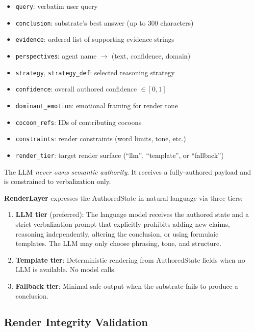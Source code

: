 \documentclass[11pt,a4paper]{article}
\begin{document}
\begin{itemize}[nosep]
  \item \texttt{query}: verbatim user query
  \item \texttt{conclusion}: substrate's best answer (up to 300 characters)
  \item \texttt{evidence}: ordered list of supporting evidence strings
  \item \texttt{perspectives}: agent name $\to$ (text, confidence, domain)
  \item \texttt{strategy}, \texttt{strategy\_def}: selected reasoning strategy
  \item \texttt{confidence}: overall authored confidence $\in [0,1]$
  \item \texttt{dominant\_emotion}: emotional framing for render tone
  \item \texttt{cocoon\_refs}: IDs of contributing cocoons
  \item \texttt{constraints}: render constraints (word limits, tone, etc.)
  \item \texttt{render\_tier}: target render surface (``llm'', ``template'',
    or ``fallback'')
\end{itemize}

The LLM \emph{never owns semantic authority}. It receives a fully-authored
payload and is constrained to verbalization only.

\textbf{RenderLayer} expresses the AuthoredState in natural language via three
tiers:

\begin{enumerate}[nosep]
  \item \textbf{LLM tier} (preferred): The language model receives the
    authored state and a strict verbalization prompt that explicitly prohibits
    adding new claims, reasoning independently, altering the conclusion, or
    using formulaic templates. The LLM may only choose phrasing, tone, and
    structure.
  \item \textbf{Template tier}: Deterministic rendering from AuthoredState
    fields when no LLM is available. No model calls.
  \item \textbf{Fallback tier}: Minimal safe output when the substrate
    fails to produce a conclusion.
\end{enumerate}

\subsection{Render Integrity Validation}
\end{document}
